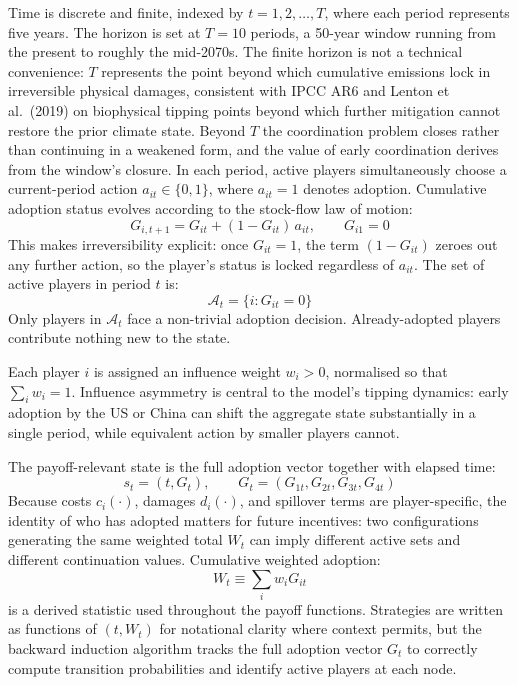 \documentclass[10pt,a4paper]{article}
\begin{document}
Time is discrete and finite, indexed by $t = 1, 2, \ldots, T$, where each period represents five years. The horizon is set at $T = 10$ periods, a 50-year window running from the present to roughly the mid-2070s. The finite horizon is not a technical convenience: $T$ represents the point beyond which cumulative emissions lock in irreversible physical damages, consistent with IPCC AR6 and Lenton et al.\ (2019) on biophysical tipping points beyond which further mitigation cannot restore the prior climate state. Beyond $T$ the coordination problem closes rather than continuing in a weakened form, and the value of early coordination derives from the window's closure. In each period, active players simultaneously choose a current-period action $a_{it} \in \{0, 1\}$, where $a_{it} = 1$ denotes adoption. Cumulative adoption status evolves according to the stock-flow law of motion:
\[
G_{i,t+1} = G_{it} + (1 - G_{it})\, a_{it}, \qquad G_{i1} = 0
\]
This makes irreversibility explicit: once $G_{it} = 1$, the term $(1 - G_{it})$ zeroes out any
further action, so the player's status is locked regardless of $a_{it}$. The set of active
players in period $t$ is:
\[
\mathcal{A}_t = \{i : G_{it} = 0\}
\]
Only players in $\mathcal{A}_t$ face a non-trivial adoption decision. Already-adopted players
contribute nothing new to the state.

Each player $i$ is assigned an influence weight $w_i > 0$, normalised so that $\sum_i w_i = 1$.
Influence asymmetry is central to the model's tipping dynamics: early adoption by the US or
China can shift the aggregate state substantially in a single period, while equivalent action
by smaller players cannot.

The payoff-relevant state is the full adoption vector together with elapsed time:
\[
s_t = (t, G_t), \qquad G_t = (G_{1t}, G_{2t}, G_{3t}, G_{4t})
\]
Because costs $c_i(\cdot)$, damages $d_i(\cdot)$, and spillover terms are player-specific,
the identity of who has adopted matters for future incentives: two configurations generating
the same weighted total $W_t$ can imply different active sets and different continuation values.
Cumulative weighted adoption:
\[
W_t \equiv \sum_i w_i G_{it}
\]
is a derived statistic used throughout the payoff functions. Strategies are written as functions
of $(t, W_t)$ for notational clarity where context permits, but the backward induction algorithm
tracks the full adoption vector $G_t$ to correctly compute transition probabilities and identify
active players at each node.
\end{document}
